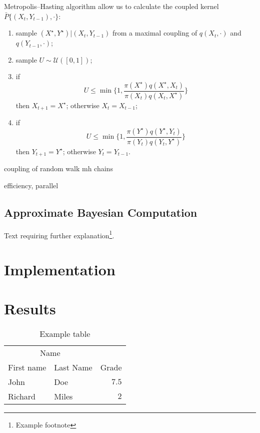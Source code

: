 \documentclass[twoside,twocolumn]{article}
\begin{document}
	Metropolis--Hasting algorithm allow us to calculate the coupled kernel $\bar P \{(X_t, Y_{t-1}), \cdot \}$:
	
	\begin{enumerate}
		\item sample $(X^\star, Y^\star) | (X_t, Y_{t-1})$ from a maximal coupling of $q(X_t, \cdot)$ and $q(Y_{t-1}, \cdot)$;
		\item sample $U \sim \mathcal{U}([0,1])$;
		\item if
		$$ U
		\leq \min\bigg \{
		1,
		\frac{ \pi(X^\star)q(X^\star,X_t)}{
			\pi(X_t)q(X_t, X^\star)}
		\bigg \}
		$$
		then $X_{t+1} = X^\star$; otherwise $X_t = X_{t-1}$;
		\item if
		$$ U
		\leq \min\bigg \{ 
		1,
		\frac{ \pi(Y^\star)q(Y^\star,Y_t)}{
			\pi(Y_t)q(Y_t, Y^\star)}
		\bigg \}
		$$
		then $Y_{t+1} = Y^\star$; otherwise $Y_t = Y_{t-1}$.
		
	\end{enumerate}




coupling of random walk mh chains



efficiency, parallel

\subsection{Approximate Bayesian Computation}





Text requiring further explanation\footnote{Example footnote}.

\section{Implementation}

\section{Results}

\begin{table}
\caption{Example table}
\centering
\begin{tabular}{llr}
\toprule
\multicolumn{2}{c}{Name} \\
\cmidrule(r){1-2}
First name & Last Name & Grade \\
\midrule
John & Doe & $7.5$ \\
Richard & Miles & $2$ \\
\bottomrule
\end{tabular}
\end{table}
\end{document}
